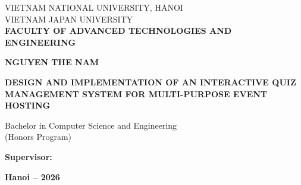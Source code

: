 \documentclass[12pt, a4paper, oneside]{report}
\begin{document}
    \begin{titlepage}
        
        \centering
        \vspace*{1cm}
        
        {\fontsize{13pt}{16pt}\selectfont
            VIETNAM NATIONAL UNIVERSITY, HANOI\\
            VIETNAM JAPAN UNIVERSITY\\
            \textbf{FACULTY OF ADVANCED TECHNOLOGIES AND ENGINEERING}\par}
        
        \vspace{3.5cm}
        
        {\fontsize{14pt}{17pt}\selectfont \textbf{NGUYEN THE NAM}\par}
        
        \vspace{3cm}
        
        {\fontsize{18pt}{22pt}\selectfont
        \parbox{0.95\textwidth}{\centering\textbf{DESIGN AND IMPLEMENTATION OF AN INTERACTIVE QUIZ MANAGEMENT SYSTEM FOR MULTI-PURPOSE EVENT HOSTING}}\par}
        
        \vspace{2cm}
        
        {\fontsize{14pt}{17pt}\selectfont
            Bachelor in Computer Science and Engineering\\
            (Honors Program)\par}
            
        \vfill
        
        {\fontsize{14pt}{17pt}\selectfont 
            \textbf{Supervisor: }\\[0.3cm]
            \textbf{\phantom{Supervisor: }}
        \par}
        
        \vspace{2cm}
        
        {\fontsize{14pt}{17pt}\selectfont \textbf{Hanoi – 2026}\par}
        
        \vspace*{1.5cm}
    \end{titlepage}
\end{document}

